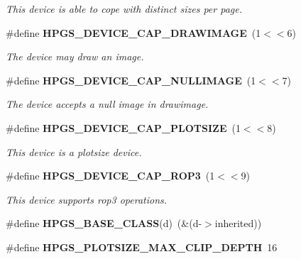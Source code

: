 \begin{DoxyCompactItemize}
\begin{DoxyCompactList}\small\item\em This device is able to cope with distinct sizes per page. \item\end{DoxyCompactList}\item 
\#define {\bf HPGS\_\-DEVICE\_\-CAP\_\-DRAWIMAGE}~(1$<$$<$6)\label{group__device_ga0e8d3be8de1ccdc0c814a7d4f50d5ea5}

\begin{DoxyCompactList}\small\item\em The device may draw an image. \item\end{DoxyCompactList}\item 
\#define {\bf HPGS\_\-DEVICE\_\-CAP\_\-NULLIMAGE}~(1$<$$<$7)\label{group__device_ga137bf6ecfa0799889cc3338b3e6e57cf}

\begin{DoxyCompactList}\small\item\em The device accepts a null image in drawimage. \item\end{DoxyCompactList}\item 
\#define {\bf HPGS\_\-DEVICE\_\-CAP\_\-PLOTSIZE}~(1$<$$<$8)\label{group__device_ga6fc3e52dd7ac9e001d1148b075d16e4c}

\begin{DoxyCompactList}\small\item\em This device is a plotsize device. \item\end{DoxyCompactList}\item 
\#define {\bf HPGS\_\-DEVICE\_\-CAP\_\-ROP3}~(1$<$$<$9)\label{group__device_ga35207578b9faef0e1602a6600c73dd39}

\begin{DoxyCompactList}\small\item\em This device supports rop3 operations. \item\end{DoxyCompactList}\item 
\#define {\bfseries HPGS\_\-BASE\_\-CLASS}(d)~(\&(d-\/$>$inherited))\label{group__device_gad40c8bf92012b37cda89ba8ee69a33a1}

\item 
\#define {\bfseries HPGS\_\-PLOTSIZE\_\-MAX\_\-CLIP\_\-DEPTH}~16\label{group__device_gae92b44de322e9c1b9fbd0f732aea9077}

\end{DoxyCompactItemize}
